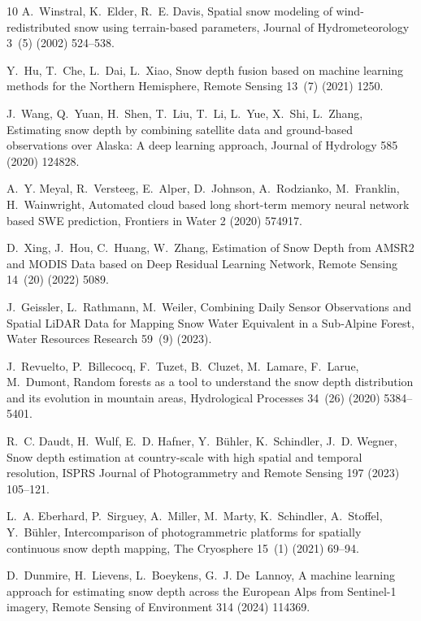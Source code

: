 \documentclass[preprint,12pt]{elsarticle}
\begin{document}
\begin{thebibliography}{10}
A.~Winstral, K.~Elder, R.~E. Davis, Spatial snow modeling of wind-redistributed snow using terrain-based parameters, Journal of Hydrometeorology 3~(5) (2002) 524--538.

Y.~Hu, T.~Che, L.~Dai, L.~Xiao, {Snow depth fusion based on machine learning methods for the Northern Hemisphere}, Remote Sensing 13~(7) (2021) 1250.

J.~Wang, Q.~Yuan, H.~Shen, T.~Liu, T.~Li, L.~Yue, X.~Shi, L.~Zhang, {Estimating snow depth by combining satellite data and ground-based observations over Alaska: A deep learning approach}, Journal of Hydrology 585 (2020) 124828.

A.~Y. Meyal, R.~Versteeg, E.~Alper, D.~Johnson, A.~Rodzianko, M.~Franklin, H.~Wainwright, {Automated cloud based long short-term memory neural network based SWE prediction}, Frontiers in Water 2 (2020) 574917.

D.~Xing, J.~Hou, C.~Huang, W.~Zhang, {Estimation of Snow Depth from AMSR2 and MODIS Data based on Deep Residual Learning Network}, Remote Sensing 14~(20) (2022) 5089.

J.~Geissler, L.~Rathmann, M.~Weiler, {Combining Daily Sensor Observations and Spatial LiDAR Data for Mapping Snow Water Equivalent in a Sub‐Alpine Forest}, Water Resources Research 59~(9) (2023).

J.~Revuelto, P.~Billecocq, F.~Tuzet, B.~Cluzet, M.~Lamare, F.~Larue, M.~Dumont, Random forests as a tool to understand the snow depth distribution and its evolution in mountain areas, Hydrological Processes 34~(26) (2020) 5384--5401.

R.~C. Daudt, H.~Wulf, E.~D. Hafner, Y.~Bühler, K.~Schindler, J.~D. Wegner, Snow depth estimation at country-scale with high spatial and temporal resolution, ISPRS Journal of Photogrammetry and Remote Sensing 197 (2023) 105--121.

L.~A. Eberhard, P.~Sirguey, A.~Miller, M.~Marty, K.~Schindler, A.~Stoffel, Y.~Bühler, Intercomparison of photogrammetric platforms for spatially continuous snow depth mapping, The Cryosphere 15~(1) (2021) 69--94.

D.~Dunmire, H.~Lievens, L.~Boeykens, G.~J. De~Lannoy, {A machine learning approach for estimating snow depth across the European Alps from Sentinel-1 imagery}, Remote Sensing of Environment 314 (2024) 114369.


\end{thebibliography}
\end{document}
